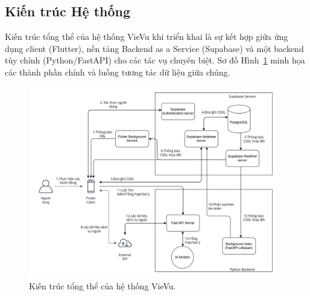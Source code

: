 \subsection{Kiến trúc Hệ thống}
\label{subsec:system_architecture_impl}

Kiến trúc tổng thể của hệ thống VieVu khi triển khai là sự kết hợp giữa ứng dụng client (Flutter), nền tảng Backend as a Service (Supabase) và một backend tùy chỉnh (Python/FastAPI) cho các tác vụ chuyên biệt. Sơ đồ Hình~\ref{fig:system_architecture} minh họa các thành phần chính và luồng tương tác dữ liệu giữa chúng.

\begin{figure}[H]
    \centering
    \includegraphics[width=1\textwidth]{figures/c4/architecture.png}
    \caption{Kiến trúc tổng thể của hệ thống VieVu.}
    \label{fig:system_architecture}
\end{figure}
